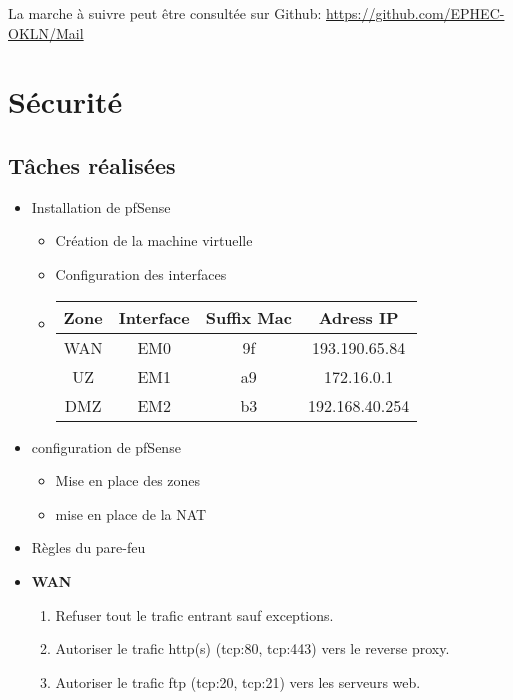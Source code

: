 \documentclass{article}
\begin{document}
La marche à suivre peut être consultée sur Github: \url{https://github.com/EPHEC-OKLN/Mail}

\section{Sécurité}
    \subsection{Tâches réalisées} 
        \begin{itemize}
            \item Installation de pfSense
            \begin{itemize}
                \item Création de la machine virtuelle
                \item Configuration des interfaces
                \item
                \begin{tabular}{|c|c|c|c|}
                \hline
                \rowcolor{lightgray} 
                \textbf{Zone} & \textbf{Interface} & \textbf{Suffix Mac} & \textbf{Adress IP} \\
                \hline 
                WAN & EM0 & 9f & 193.190.65.84 \\
                \hline
                UZ & EM1 & a9 & 172.16.0.1 \\
                \hline
                DMZ & EM2 & b3 & 192.168.40.254 \\
                \hline
                \end{tabular}
            \end{itemize}
            \item configuration de pfSense
                \begin{itemize}
                    \item Mise en place des zones
                    \item mise en place de la NAT
                \end{itemize}
            \item Règles du pare-feu
            \item \textbf{WAN} \begin{enumerate}
                \item Refuser tout le trafic entrant sauf exceptions.
                \item Autoriser le trafic http(s) (tcp:80, tcp:443) vers le reverse proxy.
                \item Autoriser le trafic ftp (tcp:20, tcp:21) vers les serveurs web.

\end{enumerate}
\end{itemize}
\end{document}
